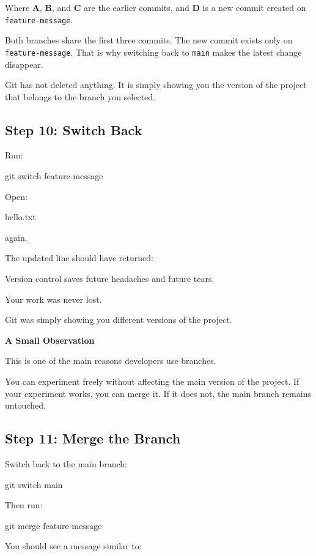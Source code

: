 \documentclass{csc2059practical}
\begin{document}
Where \textbf{A}, \textbf{B}, and \textbf{C} are the earlier commits, and \textbf{D} is a new commit created on \texttt{feature-message}.

Both branches share the first three commits. The new commit exists only on \texttt{feature-message}. That is why switching back to \texttt{main} makes the latest change disappear.

Git has not deleted anything. It is simply showing you the version of the project that belongs to the branch you selected.

\subsection{Step 10: Switch Back}
Run:

\begin{terminalplain}
git switch feature-message
\end{terminalplain}
Open:

\begin{terminalplain}
hello.txt
\end{terminalplain}
again.

The updated line should have returned:

\begin{terminalplain}
Version control saves future headaches and future tears.
\end{terminalplain}
Your work was never lost.

Git was simply showing you different versions of the project.

\begin{tipbox}
\textbf{A Small Observation}\par
\medskip
This is one of the main reasons developers use branches.

You can experiment freely without affecting the main version of the project. If your experiment works, you can merge it. If it does not, the main branch remains untouched.
\end{tipbox}

\subsection{Step 11: Merge the Branch}
Switch back to the main branch:

\begin{terminalplain}
git switch main
\end{terminalplain}
Then run:

\begin{terminalplain}
git merge feature-message
\end{terminalplain}
You should see a message similar to:
\end{document}
